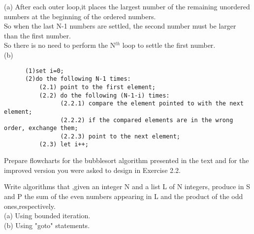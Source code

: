 \documentclass[11pt, a4paper, UTF8]{ctexart}
\begin{document}
\begin{solution}
  (a) After each outer loop,it places the largest number of the remaining unordered numbers at the beginning of the ordered numbers.\\
      So when the last N-1 numbers are settled, the second number must be larger than the first number.\\
      So there is no need to perform the N$^{th}$ loop to settle the first number.\\
  (b) \\
\begin{verbatim}
      (1)set i=0;
      (2)do the following N-1 times:
          (2.1) point to the first element;
          (2.2) do the following (N-1-i) times:
                (2.2.1) compare the element pointed to with the next element;
                (2.2.2) if the compared elements are in the wrong order, exchange them;
                (2.2.3) point to the next element;
          (2.3) let i++;
\end{verbatim}
\end{solution}
\begin{problem}[DH:2.3]
Prepare flowcharts for the bubblesort algorithm presented in the text and for the improved version you were asked to design in Exercise 2.2.\\
\end{problem}


\begin{solution}

\end{solution}


\begin{problem}[DH:2.4]
Write algorithms that ,given an integer N and a list L of N integers, produce in S and P the sum of the even numbers appearing in L and the product of the odd ones,respectively.\\
(a) Using bounded iteration.\\
(b) Using "goto" statements.
\end{problem}
\end{document}
